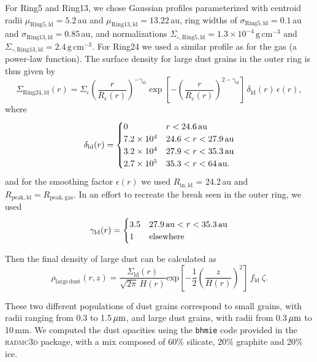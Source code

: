 \documentclass[fleqn,usenatbib,useAMS]{mnras}
\begin{document}
For Ring5 and Ring13, we chose Gaussian profiles parameterized with centroid radii $\mu_{\mathrm{Ring5, ld}}=5.2$\,au and $\mu_{\mathrm{Ring13, ld}}=13.22$\,au, ring widths of $\sigma_{\mathrm{Ring5,ld}}=0.1$\,au and $\sigma_{\mathrm{Ring13,ld}}=0.85$\,au, and normalizations $\Sigma_{\circ,\mathrm{Ring5,ld}}=1.3\times10^{-4}\,\mathrm{g\,cm^{-3}}$ and $\Sigma_{\circ,\mathrm{Ring13,ld}}=2.4\,\mathrm{g\,cm^{-3}}$. For Ring24 we used a similar profile as for the gas (a power-law function). The surface density for large dust grains in the outer ring is thus given by
\begin{equation}
    \Sigma_{\mathrm{Ring24,ld}}(r) = \Sigma_{\mathrm{c}} \left(\frac{r}{R_{\mathrm{c}}(r)}\right)^{-\gamma_{\mathrm{ld}}} \exp\left[-\left(\frac{r}{R_{\mathrm{c}}(r)}\right)^{2-\gamma_{\mathrm{ld}}}\right]\,\delta_{\mathrm{ld}}(r) \,\epsilon(r),
\end{equation}
where
\begin{equation}
  \delta_{\mathrm{ld}}(r) =
  \begin{cases}
  0                 & r < 24.6\text{\,au} \\
  7.2 \times10^{4} & 24.6 < r < 27.9\text{\,au} \\
  3.2 \times10^{4} & 27.9 < r < 35.3\text{\,au} \\
  2.7 \times10^{5} & 35.3 < r < 64\text{\,au.} \\
  \end{cases}
\end{equation}
and for the smoothing factor $\epsilon(r)$ we used $R_\mathrm{in,ld}$ = 24.2\,au and $R_\mathrm{peak,ld} = R_\mathrm{peak,gas}$. In an effort to recreate the break seen in the outer ring, we used
\begin{equation}
  \gamma_{\mathrm{ld}}(r) =
  \begin{cases}
  3.5 & 27.9\text{\,au} < r < 35.3\text{\,au} \\
    1                 &  {\rm elsewhere} \\
  \end{cases}
\end{equation}

Then the final density of large dust can be calculated as
\begin{equation}
\rho_{\mathrm{large\,dust}}(r,z)=
\frac{\Sigma_{\mathrm{ld}}(r)}{\sqrt{2\pi} \, H(r)} \mathrm{exp}\left[-\frac{1}{2} \left(\frac{z}{H(r)}\right)^2\right] \, f_{\mathrm{ld}} \: \zeta.
\end{equation}

These two different populations of dust grains correspond to small grains, with radii ranging from 0.3 to 1.5\,$\hbox{$\mu$m}$, and large dust grains, with radii from 0.3\,$\hbox{$\mu$m}$ to 10\,mm. We computed the dust opacities using the {\tt bhmie} code provided in the \textsc{radmc3d} package, with a mix composed of 60\% silicate, 20\% graphite and 20\% ice.
\end{document}
